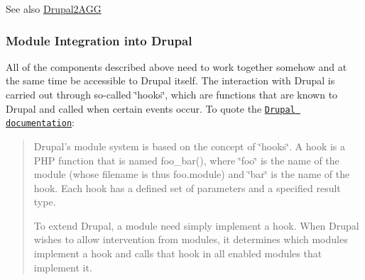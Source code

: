 \begin{DoxySeeAlso}{See also}
\hyperlink{group___drupal2_a_g_g}{Drupal2\+A\+G\+G}
\end{DoxySeeAlso}
\hypertarget{index_Integration}{}\subsubsection{Module Integration into Drupal}\label{index_Integration}
All of the components described above need to work together somehow and at the same time be accessible to Drupal itself. The interaction with Drupal is carried out through so-\/called \char`\"{}hooks\char`\"{}, which are functions that are known to Drupal and called when certain events occur. To quote the \href{https://api.drupal.org/api/drupal/includes!module.inc/group/hooks/7}{\tt Drupal documentation}\+: \begin{quote}
Drupal's module system is based on the concept of \char`\"{}hooks\char`\"{}. A hook is a P\+H\+P function that is named foo\+\_\+bar(), where \char`\"{}foo\char`\"{} is the name of the module (whose filename is thus foo.\+module) and \char`\"{}bar\char`\"{} is the name of the hook. Each hook has a defined set of parameters and a specified result type.

To extend Drupal, a module need simply implement a hook. When Drupal wishes to allow intervention from modules, it determines which modules implement a hook and calls that hook in all enabled modules that implement it. \end{quote}


